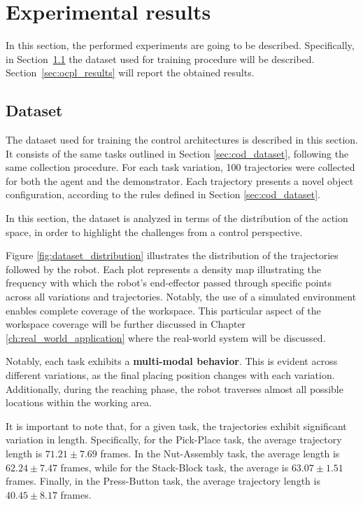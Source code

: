 \section{Experimental results}
\label{sec:ocpl_experimental}

In this section, the performed experiments are going to be described. Specifically, in  
Section~\ref{sec:ocpl_dataset} the dataset used for training procedure will be described. Section~\ref{sec:ocpl_results} will report the obtained results.

\subsection{Dataset}
\label{sec:ocpl_dataset}
The dataset used for training the control architectures is described in this section. It consists of the same tasks outlined in Section \ref{sec:cod_dataset}, following the same collection procedure. For each task variation, 100 trajectories were collected for both the agent and the demonstrator. Each trajectory presents a novel object configuration, according to the rules defined in Section \ref{sec:cod_dataset}.

In this section, the dataset is analyzed in terms of the distribution of the action space, in order to highlight the challenges from a control perspective.

Figure \ref{fig:dataset_distribution} illustrates the distribution of the trajectories followed by the robot. Each plot represents a density map illustrating the frequency with which the robot's end-effector passed through specific points across all variations and trajectories. Notably, the use of a simulated environment enables complete coverage of the workspace. This particular aspect of the workspace coverage will be further discussed in Chapter \ref{ch:real_world_application} where the real-world system will be discussed.



Notably, each task exhibits a \textbf{multi-modal behavior}. This is evident across different variations, as the final placing position changes with each variation. Additionally, during the reaching phase, the robot traverses almost all possible locations within the working area.

It is important to note that, for a given task, the trajectories exhibit significant variation in length. Specifically, for the Pick-Place task, the average trajectory length is \textbf{$71.21 \pm 7.69$} frames. In the Nut-Assembly task, the average length is \textbf{$62.24 \pm 7.47$} frames, while for the Stack-Block task, the average is \textbf{$63.07 \pm 1.51$} frames. Finally, in the Press-Button task, the average trajectory length is\textbf{ $40.45 \pm 8.17$} frames. 

